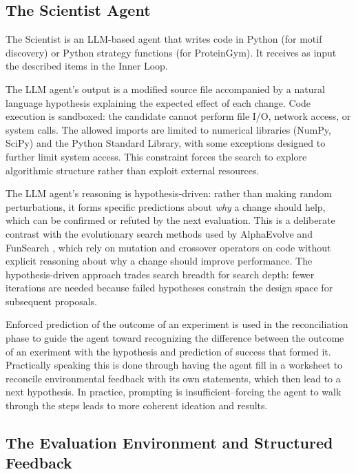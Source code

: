 \documentclass[11pt,a4paper]{article}
\begin{document}
\subsection{The Scientist Agent}

The Scientist is an LLM-based agent that writes code in Python (for motif discovery) or Python strategy functions (for ProteinGym). It receives as input the described items in the Inner Loop.

The LLM agent's output is a modified source file accompanied by a natural language hypothesis explaining the expected effect of each change. Code execution is sandboxed: the candidate cannot perform file I/O, network access, or system calls. The allowed imports are limited to numerical libraries (NumPy, SciPy) and the Python Standard Library, with some exceptions designed to further limit system access. This constraint forces the search to explore algorithmic structure rather than exploit external resources.

The LLM agent's reasoning is hypothesis-driven: rather than making random perturbations, it forms specific predictions about \emph{why} a change should help, which can be confirmed or refuted by the next evaluation. This is a deliberate contrast with the evolutionary search methods used by AlphaEvolve \citep{novikov2025alphaevolve} and FunSearch \citep{romera2024funsearch}, which rely on mutation and crossover operators on code without explicit reasoning about why a change should improve performance. The hypothesis-driven approach trades search breadth for search depth: fewer iterations are needed because failed hypotheses constrain the design space for subsequent proposals.  

Enforced prediction of the outcome of an experiment is used in the reconciliation phase to guide the agent toward recognizing the difference between the outcome of an exeriment with the hypothesis and prediction of success that formed it.  Practically speaking this is done through having the agent fill in a worksheet to reconcile environmental feedback with its own statements, which then lead to a next hypothesis.  In practice, prompting is insufficient--forcing the agent to walk through the steps leads to more coherent ideation and results.

\subsection{The Evaluation Environment and Structured Feedback}
\end{document}
